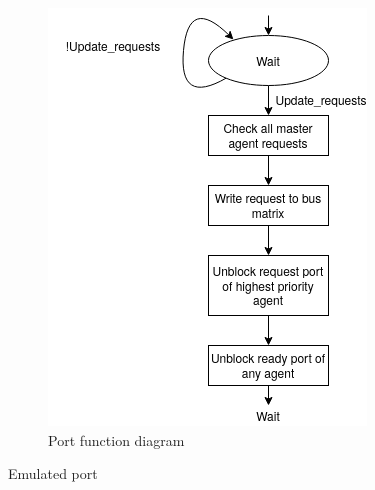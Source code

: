 \begin{figure}[hbt]
\begin{subfigure}[b]{0.3\linewidth}
 \includegraphics[width=\linewidth]{figs/ESL/port_fsm.png}
 \caption{Port function diagram}
 \end{subfigure}
\caption{Emulated port}
\label{fig:em-port}
\end{figure}


